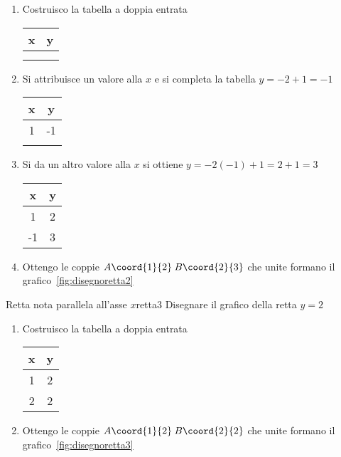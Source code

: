 \begin{enumerate}
	\item Costruisco la tabella a doppia entrata 
	\begin{tabular}{c|c}
		x & y\\
		\hline 
		&  \\ 
		&  \\ 
	\end{tabular}
	\item Si attribuisce  un valore alla $x$ e si completa la tabella
	$y=-2+1=-1$
	\begin{tabular}{c|c}
		x & y\\
		\hline 
		1	& -1 \\ 
		&  \\ 
	\end{tabular}
	\item Si da un altro valore alla $x$ si ottiene 
	$y=-2(-1)+1=2+1=3$
	\begin{tabular}{c|c}
		x & y\\
		\hline 
		1	& 2 \\ 
		-1& 3 \\ 
	\end{tabular}
	\item Ottengo le coppie $A\coord{1}{2}$\,$B\coord{2}{3}$ che unite formano il grafico~\vref{fig:disegnoretta2}
\end{enumerate}
\begin{center}
	
	\label{fig:disegnoretta2}
\end{center}
\begin{esempiot}{Retta nota parallela all'asse $x$}{retta3}
	Disegnare il grafico della retta $y=2$
\end{esempiot}
\begin{enumerate}
	\item Costruisco la tabella a doppia entrata 
	\begin{tabular}{c|c}
		x & y\\
		\hline 
		1&2\\ 
		2&2\\ 
	\end{tabular}
	\item Ottengo le coppie $A\coord{1}{2}$\,$B\coord{2}{2}$ che unite formano il grafico~\vref{fig:disegnoretta3}
\end{enumerate}
\begin{center}
	
	\label{fig:disegnoretta3}
\end{center}
